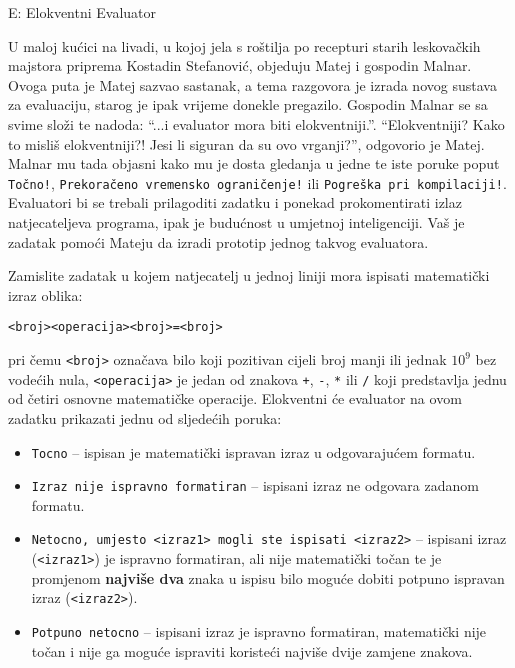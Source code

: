 \begin{statement}[
  timelimit=1 s,
  memorylimit=512 MiB,
]{E: Elokventni Evaluator}

U maloj kućici na livadi, u kojoj jela s roštilja po recepturi starih
leskovačkih majstora priprema Kostadin Stefanović, objeduju Matej i gospodin
Malnar. Ovoga puta je Matej sazvao sastanak, a tema razgovora je izrada novog
sustava za evaluaciju, starog je ipak vrijeme donekle pregazilo.
Gospodin Malnar se sa svime složi te nadoda: ``...i evaluator mora biti
elokventniji.''. ``Elokventniji? Kako to misliš elokventniji?! Jesi li siguran
da su ovo vrganji?'', odgovorio je Matej. Malnar mu tada objasni kako mu je
dosta gledanja u jedne te iste poruke poput \texttt{Točno!},
\texttt{Prekoračeno vremensko ograničenje!} ili \texttt{Pogreška pri kompilaciji!}.
Evaluatori bi se trebali prilagoditi zadatku i ponekad prokomentirati izlaz
natjecateljeva programa, ipak je budućnost u umjetnoj inteligenciji. Vaš je
zadatak pomoći Mateju da izradi prototip jednog takvog evaluatora.

Zamislite zadatak u kojem natjecatelj u jednoj liniji mora ispisati matematički
izraz oblika:
\begin{center}
\texttt{<broj><operacija><broj>=<broj>}
\end{center}
pri čemu \texttt{<broj>}
označava bilo koji pozitivan cijeli broj manji ili jednak $10^9$ bez vodećih nula,
\texttt{<operacija>} je jedan od znakova \texttt{+}, \texttt{-}, \texttt{*} ili
\texttt{/} koji predstavlja jednu od četiri osnovne matematičke operacije.
Elokventni će evaluator na ovom zadatku prikazati jednu od sljedećih poruka:

\begin{itemize}
  \item \texttt{Tocno} -- ispisan je matematički ispravan izraz u odgovarajućem formatu.
  \item \texttt{Izraz nije ispravno formatiran} -- ispisani izraz ne odgovara zadanom formatu.
  \item \texttt{Netocno, umjesto <izraz1> mogli ste ispisati <izraz2>} --
    ispisani izraz (\texttt{<izraz1>}) je ispravno formatiran, ali nije
    matematički točan te je promjenom \textbf{najviše dva} znaka u ispisu bilo
    moguće dobiti potpuno ispravan izraz (\texttt{<izraz2>}).
  \item \texttt{Potpuno netocno} -- ispisani izraz je ispravno formatiran,
    matematički nije točan i nije ga moguće ispraviti koristeći najviše dvije
    zamjene znakova.
\end{itemize}

\end{statement}
